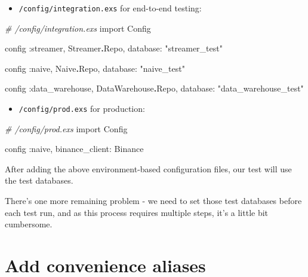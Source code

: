 \documentclass[
  oneside]{book}
\newenvironment{Shaded}{\begin{snugshade}}{\end{snugshade}}
\newcommand{\CommentTok}[1]{\textcolor[rgb]{0.56,0.35,0.01}{\textit{#1}}}
\newcommand{\ConstantTok}[1]{\textcolor[rgb]{0.56,0.35,0.01}{#1}}
\newcommand{\ImportTok}[1]{#1}
\newcommand{\NormalTok}[1]{#1}
\newcommand{\OperatorTok}[1]{\textcolor[rgb]{0.81,0.36,0.00}{\textbf{#1}}}
\newcommand{\StringTok}[1]{\textcolor[rgb]{0.31,0.60,0.02}{#1}}
\newcommand{\VariableTok}[1]{\textcolor[rgb]{0.00,0.00,0.00}{#1}}
\providecommand{\tightlist}{%
  \setlength{\itemsep}{0pt}\setlength{\parskip}{0pt}}
\begin{document}
\begin{itemize}
\tightlist
\item
  \texttt{/config/integration.exs} for end-to-end testing:
\end{itemize}

\begin{Shaded}
\begin{Highlighting}[]
\CommentTok{\# /config/integration.exs}
\ImportTok{import} \ConstantTok{Config}

\NormalTok{config }\VariableTok{:streamer}\NormalTok{, }\ConstantTok{Streamer}\OperatorTok{.}\ConstantTok{Repo}\NormalTok{, }\VariableTok{database:} \StringTok{"streamer\_test"}

\NormalTok{config }\VariableTok{:naive}\NormalTok{, }\ConstantTok{Naive}\OperatorTok{.}\ConstantTok{Repo}\NormalTok{, }\VariableTok{database:} \StringTok{"naive\_test"}

\NormalTok{config }\VariableTok{:data\_warehouse}\NormalTok{, }\ConstantTok{DataWarehouse}\OperatorTok{.}\ConstantTok{Repo}\NormalTok{, }\VariableTok{database:} \StringTok{"data\_warehouse\_test"}
\end{Highlighting}
\end{Shaded}

\begin{itemize}
\tightlist
\item
  \texttt{/config/prod.exs} for production:
\end{itemize}

\begin{Shaded}
\begin{Highlighting}[]
\CommentTok{\# /config/prod.exs}
\ImportTok{import} \ConstantTok{Config}

\NormalTok{config }\VariableTok{:naive}\NormalTok{,}
  \VariableTok{binance\_client:} \ConstantTok{Binance}
\end{Highlighting}
\end{Shaded}

After adding the above environment-based configuration files, our test will use the test databases.

There's one more remaining problem - we need to set those test databases before each test run, and as this process requires multiple steps, it's a little bit cumbersome.

\section{Add convenience aliases}\label{add-convenience-aliases}
\end{document}
